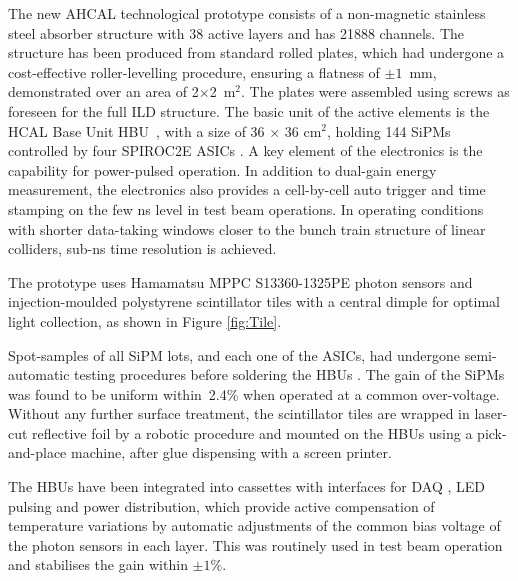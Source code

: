 The new AHCAL technological prototype consists of a non-magnetic stainless steel absorber structure with 38 active layers and has 21888 channels. 
The structure has been produced from standard rolled plates, which had undergone a cost-effective roller-levelling procedure, ensuring a flatness of $\pm 1$~mm, demonstrated over an area of 2$\times$2~m$^2$. The plates were assembled using screws as foreseen for the full ILD structure. 
The basic unit of the active elements is the HCAL Base Unit HBU~\cite{6829522}, with a size of 36 $\times$ 36 cm$^2$, holding 144 SiPMs controlled by four SPIROC2E ASICs \cite{Bouchel:2011zz}.  A key element of the electronics is the capability for power-pulsed operation.
In addition to dual-gain energy measurement, the electronics also provides a cell-by-cell auto trigger and time stamping on the few ns level in test beam operations. In operating conditions with shorter data-taking windows closer to the bunch train structure of linear colliders, sub-ns time resolution is achieved. 

The prototype uses Hamamatsu MPPC S13360-1325PE photon sensors and injection-moulded polystyrene scintillator tiles with a central dimple \cite{Liu:2015cpe} for optimal light collection, as shown in Figure \ref{fig:Tile}. 

Spot-samples of all SiPM lots, and each one of the ASICs, had undergone semi-automatic testing procedures before soldering the HBUs \cite{Munwes:2634923}. The gain of the SiPMs was found to be uniform within~2.4\% when operated at a common over-voltage.
Without any further surface treatment, the scintillator tiles are wrapped in laser-cut reflective foil by a robotic procedure and mounted on the HBUs using a pick-and-place machine, after glue dispensing with a screen printer.   

The HBUs have been integrated into cassettes with interfaces for DAQ \cite{Kvasnicka:2017bpx}, LED pulsing and power distribution, which provide active compensation of temperature variations by automatic adjustments of the common bias voltage of the photon sensors in each layer. This was routinely used in test beam operation and stabilises the gain within $\pm 1\%$.

